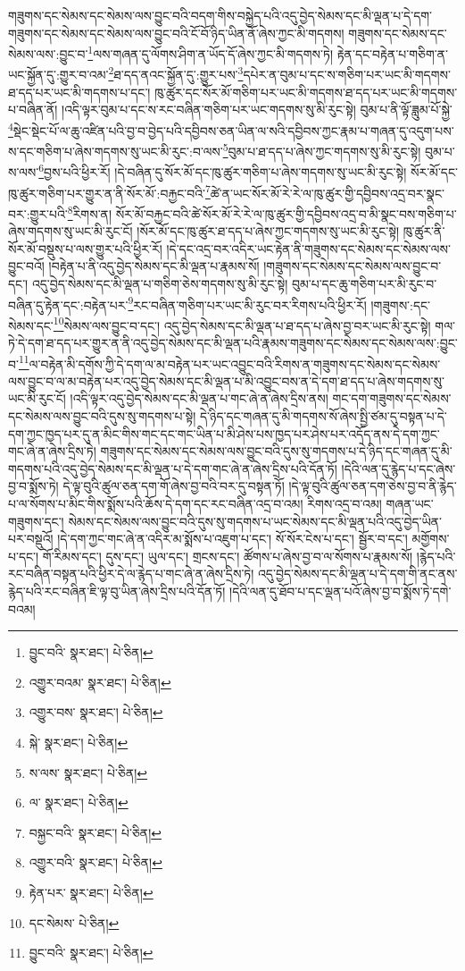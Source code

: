 གཟུགས་དང་སེམས་དང་སེམས་ལས་བྱུང་བའི་བདག་གིས་བསྐྱེད་པའི་འདུ་བྱེད་སེམས་དང་མི་ལྡན་པ་དེ་དག་གཟུགས་དང་སེམས་དང་སེམས་ལས་བྱུང་བའི་ངོ་བོ་ཉིད་ཡིན་ནོ་ཞེས་ཀྱང་མི་གདགས། གཟུགས་དང་སེམས་དང་སེམས་ལས་:བྱུང་བ་\footnote{བྱུང་བའི་  སྣར་ཐང་།  པེ་ཅིན། }ལས་གཞན་དུ་ལོགས་ཤིག་ན་ཡོད་དོ་ཞེས་ཀྱང་མི་གདགས་ཏེ། རྟེན་དང་བརྟེན་པ་གཅིག་ན་ཡང་སྐྱོན་དུ་:གྱུར་བ་འམ་\footnote{འགྱུར་བའམ་  སྣར་ཐང་།  པེ་ཅིན། }ཐ་དད་ནའང་སྐྱོན་དུ་:གྱུར་པས་\footnote{འགྱུར་བས་  སྣར་ཐང་།  པེ་ཅིན། }དཔེར་ན་བུམ་པ་དང་ས་གཅིག་པར་ཡང་མི་གདགས་ཐ་དད་པར་ཡང་མི་གདགས་པ་དང་། ཁུ་ཚུར་དང་སོར་མོ་གཅིག་པར་ཡང་མི་གདགས་ཐ་དད་པར་ཡང་མི་གདགས་པ་བཞིན་ནོ། །འདི་ལྟར་བུམ་པ་དང་ས་རང་བཞིན་གཅིག་པར་ཡང་གདགས་སུ་མི་རུང་སྟེ། བུམ་པ་ནི་ལྟོ་ཟླུམ་པོ་སྐྱེ་\footnote{སྐེ་  སྣར་ཐང་།  པེ་ཅིན། }སྡེང་སྡེང་པོ་ལ་ཆུ་འཛིན་པའི་བྱ་བ་བྱེད་པའི་དབྱིབས་ཅན་ཡིན་ལ་སའི་དབྱིབས་ཀྱང་རྣམ་པ་གཞན་དུ་འདུག་པས་ས་དང་གཅིག་པ་ཞེས་གདགས་སུ་ཡང་མི་རུང་:བ་ལས་\footnote{ས་ལས་  སྣར་ཐང་།  པེ་ཅིན། }བུམ་པ་ཐ་དད་པ་ཞེས་ཀྱང་གདགས་སུ་མི་རུང་སྟེ། བུམ་པ་ས་ལས་\footnote{ལ་  སྣར་ཐང་།  པེ་ཅིན། }བྱས་པའི་ཕྱིར་རོ། །དེ་བཞིན་དུ་སོར་མོ་དང་ཁུ་ཚུར་གཅིག་པ་ཞེས་གདགས་སུ་ཡང་མི་རུང་སྟེ། སོར་མོ་དང་ཁུ་ཚུར་གཅིག་པར་གྱུར་ན་ནི་སོར་མོ་:བརྐྱང་བའི་\footnote{བསྐྱང་བའི་  སྣར་ཐང་།  པེ་ཅིན། }ཚེ་ན་ཡང་སོར་མོ་རེ་རེ་ལ་ཁུ་ཚུར་གྱི་དབྱིབས་འདྲ་བར་སྣང་བར་:གྱུར་པའི་\footnote{འགྱུར་བའི་  སྣར་ཐང་།  པེ་ཅིན། }རིགས་ན། སོར་མོ་བརྐྱང་བའི་ཚེ་སོར་མོ་རེ་རེ་ལ་ཁུ་ཚུར་གྱི་དབྱིབས་འདྲ་བ་མི་སྣང་བས་གཅིག་པ་ཞེས་གདགས་སུ་ཡང་མི་རུང་ངོ། །སོར་མོ་དང་ཁུ་ཚུར་ཐ་དད་པ་ཞེས་ཀྱང་གདགས་སུ་ཡང་མི་རུང་སྟེ། ཁུ་ཚུར་ནི་སོར་མོ་བསྡུས་པ་ལས་གྱུར་པའི་ཕྱིར་རོ། །དེ་དང་འདྲ་བར་འདིར་ཡང་རྟེན་ནི་གཟུགས་དང་སེམས་དང་སེམས་ལས་བྱུང་བའོ། །བརྟེན་པ་ནི་འདུ་བྱེད་སེམས་དང་མི་ལྡན་པ་རྣམས་སོ། །གཟུགས་དང་སེམས་དང་སེམས་ལས་བྱུང་བ་དང་། འདུ་བྱེད་སེམས་དང་མི་ལྡན་པ་གཅིག་ཅེས་གདགས་སུ་མི་རུང་སྟེ། བུམ་པ་དང་ཆུ་གཅིག་པར་མི་རུང་བ་བཞིན་དུ་རྟེན་དང་:བརྟེན་པར་\footnote{རྟེན་པར་  སྣར་ཐང་།  པེ་ཅིན། }རང་བཞིན་གཅིག་པར་ཡང་མི་རུང་བར་རིགས་པའི་ཕྱིར་རོ། །གཟུགས་:དང་སེམས་དང་\footnote{དང་སེམས་  པེ་ཅིན། }སེམས་ལས་བྱུང་བ་དང་། འདུ་བྱེད་སེམས་དང་མི་ལྡན་པ་ཐ་དད་པ་ཞེས་བྱ་བར་ཡང་མི་རུང་སྟེ། གལ་ཏེ་དེ་དག་ཐ་དད་པར་གྱུར་ན་ནི་འདུ་བྱེད་སེམས་དང་མི་ལྡན་པའི་རྣམས་གཟུགས་དང་སེམས་དང་སེམས་ལས་:བྱུང་བ་\footnote{བྱུང་བའི་  སྣར་ཐང་།  པེ་ཅིན། }ལ་བརྟེན་མི་དགོས་ཀྱི་དེ་དག་ལ་མ་བརྟེན་པར་ཡང་འབྱུང་བའི་རིགས་ན་གཟུགས་དང་སེམས་དང་སེམས་ལས་བྱུང་བ་ལ་མ་བརྟེན་པར་འདུ་བྱེད་སེམས་དང་མི་ལྡན་པ་མི་འབྱུང་བས་ན་དེ་དག་ཐ་དད་པ་ཞེས་གདགས་སུ་ཡང་མི་རུང་ངོ། །འདི་ལྟར་འདུ་བྱེད་སེམས་དང་མི་ལྡན་པ་གང་ཞེ་ན་ཞེས་དྲིས་ནས། གང་དག་གཟུགས་དང་སེམས་དང་སེམས་ལས་བྱུང་བའི་དུས་སུ་གདགས་པ་སྟེ། དེ་ཉིད་དང་གཞན་དུ་མི་གདགས་སོ་ཞེས་སྤྱི་ཙམ་དུ་བསྟན་པ་དེ་དག་ཀྱང་ཁྱད་པར་དུ་ན་མིང་གིས་གང་དང་གང་ཡིན་པ་མི་ཤེས་པས་ཁྱད་པར་ཤེས་པར་འདོད་ནས་དེ་དག་ཀྱང་གང་ཞེ་ན་ཞེས་དྲིས་ཏེ། གཟུགས་དང་སེམས་དང་སེམས་ལས་བྱུང་བའི་དུས་སུ་གདགས་པ་དེ་ཉིད་དང་གཞན་དུ་མི་གདགས་པའི་འདུ་བྱེད་སེམས་དང་མི་ལྡན་པ་དེ་དག་གང་ཞེ་ན་ཞེས་དྲིས་པའི་དོན་ཏོ། །དེའི་ལན་དུ་རྙེད་པ་དང་ཞེས་བྱ་བ་སྨོས་ཏེ། དེ་ལྟ་བུའི་ཚུལ་ཅན་དག་གོ་ཞེས་བྱ་བའི་བར་དུ་བསྟན་ཏོ། །དེ་ལྟ་བུའི་ཚུལ་ཅན་དག་ཅེས་བྱ་བ་ནི་རྙེད་པ་ལ་སོགས་པ་མིང་གིས་སྨོས་པའི་ཆོས་དེ་དག་དང་རང་བཞིན་འདྲ་བ་འམ། རིགས་འདྲ་བ་འམ། གཞན་ཡང་གཟུགས་དང་། སེམས་དང་སེམས་ལས་བྱུང་བའི་དུས་སུ་གདགས་པ་ཡང་སེམས་དང་མི་ལྡན་པའི་འདུ་བྱེད་ཡིན་པར་བསྡུའོ། །དེ་དག་ཀྱང་གང་ཞེ་ན་འདིར་མ་སྨོས་པ་འཇུག་པ་དང་། སོ་སོར་ངེས་པ་དང་། སྦྱོར་བ་དང་། མགྱོགས་པ་དང་། གོ་རིམས་དང་། དུས་དང་། ཡུལ་དང་། གྲངས་དང་། ཚོགས་པ་ཞེས་བྱ་བ་ལ་སོགས་པ་རྣམས་སོ། །རྙེད་པའི་རང་བཞིན་བསྟན་པའི་ཕྱིར་དེ་ལ་རྙེད་པ་གང་ཞེ་ན་ཞེས་དྲིས་ཏེ། འདུ་བྱེད་སེམས་དང་མི་ལྡན་པ་དེ་དག་གི་ནང་ནས་རྙེད་པའི་རང་བཞིན་ཇི་ལྟ་བུ་ཡིན་ཞེས་དྲིས་པའི་དོན་ཏོ། །དེའི་ལན་དུ་ཐོབ་པ་དང་ལྡན་པའོ་ཞེས་བྱ་བ་སྨོས་ཏེ་དགེ་བའམ། 